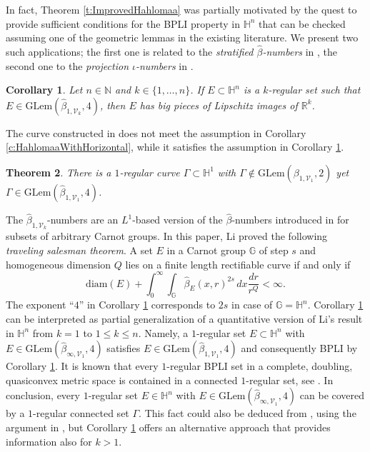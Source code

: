\documentclass[12pt]{amsart}
\numberwithin{equation}{section}
\theoremstyle{plain}
\newtheorem{theorem}{Theorem}[section]
\newtheorem{corollary}[theorem]{Corollary}
\theoremstyle{definition}
\theoremstyle{remark}
\begin{document}
\medskip

In fact, Theorem \ref{t:ImprovedHahlomaa} was partially motivated by the quest to provide sufficient conditions for the BPLI property in $\mathbb{H}^n$ that can be checked assuming one of the geometric lemmas in the existing literature. We present two such applications; the first one is related to the \emph{stratified $\hat\beta$-numbers} in \cite{Li}, the second one to the \emph{projection $\iota$-numbers} in \cite{FV2}. 


\begin{corollary}\label{c:HahlomaaWithStratifASs}
    Let $n\in \mathbb{N}$ and $k\in \{1,\ldots,n\}$. If $E\subset \mathbb{H}^n$ is a $k$-regular set such that $E\in \mathrm{GLem}(\widehat{\beta}_{1,\mathcal{V}_k},4)$, then $E$ has big pieces of Lipschitz images of $\mathbb{R}^k$. 
\end{corollary}

The curve constructed in \cite{Juillet} does not meet the assumption in Corollary \ref{c:HahlomaaWithHorizontal}, while it satisfies the assumption in Corollary \ref{c:HahlomaaWithStratifASs}.
\begin{theorem}\label{t:JuilletCurveInNotIn}
    There is a $1$-regular curve $\Gamma\subset \mathbb{H}^1$ with  $\Gamma\notin \mathrm{GLem}(\beta_{1,\mathcal{V}_1},2)$ yet $\Gamma \in \mathrm{GLem}(\widehat{\beta}_{1,\mathcal{V}_1},4)$.
\end{theorem}
The $\widehat{\beta}_{1,\mathcal{V}_k}$-numbers are an $L^1$-based version of the $\hat \beta$-numbers introduced in
\cite{Li} for subsets of arbitrary Carnot groups. In this paper, Li proved the following \emph{traveling salesman theorem}. A set $E$ in a Carnot group $\mathbb{G}$ of step $s$ and homogeneous dimension $Q$ lies on a finite length rectifiable curve if and only if
\begin{displaymath}
 \mathrm{diam}(E) +   \int_0^{\infty} \int_{\mathbb{G}}\hat \beta_E(x,r)^{2s}\,dx\frac{dr}{r^Q}<\infty.
\end{displaymath}
The exponent ``$4$'' in Corollary \ref{c:HahlomaaWithStratifASs} corresponds to $2s$ in case of 
$\mathbb{G}=\mathbb{H}^n$. Corollary \ref{c:HahlomaaWithStratifASs} can be interpreted as partial generalization of  a quantitative version of Li's result \cite{Li} in $\mathbb{H}^n$ from $k=1$ to $1\leq k\leq n$. 
Namely, a $1$-regular set  $E\subset \mathbb{H}^n$ with  $E\in \mathrm{GLem}(\widehat{\beta}_{\infty,\mathcal{V}_1},4)$ satisfies  $E\in \mathrm{GLem}(\widehat{\beta}_{1,\mathcal{V}_1},4)$ and consequently BPLI by
Corollary \ref{c:HahlomaaWithStratifASs}. It is known that every $1$-regular BPLI set in a complete, doubling, quasiconvex metric space is contained in a connected $1$-regular set, see \cite[Corollary 4.6]{FV1}. In conclusion, every $1$-regular set $E\in \mathbb{H}^n$ with
$E\in \mathrm{GLem}(\widehat{\beta}_{\infty,\mathcal{V}_1},4)$ can be covered by a $1$-regular connected set $\Gamma$.
This fact could also be deduced from \cite{Li}, using the argument in \cite[Section 3]{FV1}, but Corollary \ref{c:HahlomaaWithStratifASs} offers an alternative approach that provides information also for $k>1$.
\end{document}
